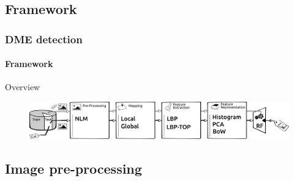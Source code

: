 \documentclass{beamer}
\begin{document}
\subsection{Framework}

\begin{frame}
  \frametitle{DME detection}
  \framesubtitle{Framework}
  \begin{block}{Overview}
    \begin{figure}
      \centering
      \includegraphics[width=1.\textwidth]{./images/ml.png}
    \end{figure}
  \end{block}
\end{frame}

\subsection{Image pre-processing}
\end{document}
